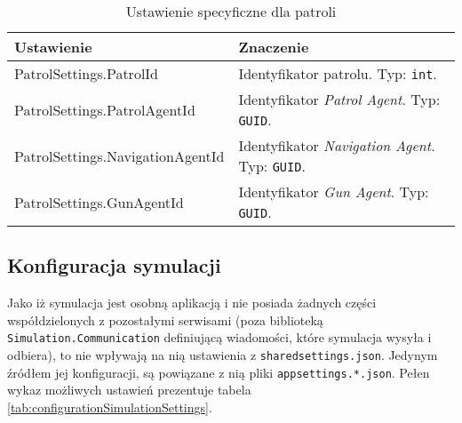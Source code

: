 \begin{table}[H]
    \centering
    \begin{tabular}{|p{0.5\linewidth} | p{0.5\linewidth}|} 
     \hline
     Ustawienie & Znaczenie \\
     \hline
     \hline
     PatrolSettings.PatrolId & Identyfikator patrolu. Typ: \texttt{int}. \\ 
     \hline
     PatrolSettings.PatrolAgentId & Identyfikator \emph{Patrol Agent}. Typ: \texttt{GUID}. \\ 
     \hline
     PatrolSettings.NavigationAgentId & Identyfikator \emph{Navigation Agent}. Typ: \texttt{GUID}. \\ 
     \hline
     PatrolSettings.GunAgentId & Identyfikator \emph{Gun Agent}. Typ: \texttt{GUID}. \\ 
     \hline
    \end{tabular}
    \caption{Ustawienie specyficzne dla patroli}
    \label{tab:configurationPatrolServiceSettings}
\end{table}


\subsection{Konfiguracja symulacji}

\par Jako iż symulacja jest osobną aplikacją i nie posiada żadnych części współdzielonych z pozostałymi serwisami (poza biblioteką \texttt{Simulation.Communication} definiującą wiadomości, które symulacja wysyła i odbiera), to nie wpływają na nią ustawienia z \texttt{sharedsettings.json}. Jedynym źródłem jej konfiguracji, są powiązane z nią pliki \texttt{appsettings.*.json}. Pełen wykaz możliwych ustawień prezentuje tabela \ref{tab:configurationSimulationSettings}.


